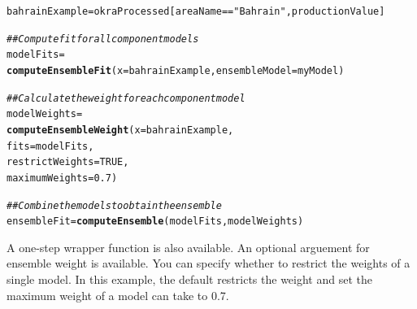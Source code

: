 \documentclass[nojss]{jss}\usepackage[]{graphicx}\usepackage[]{color}
\makeatletter
\newcommand{\hlnum}[1]{\textcolor[rgb]{0.686,0.059,0.569}{#1}}%
\newcommand{\hlstr}[1]{\textcolor[rgb]{0.192,0.494,0.8}{#1}}%
\newcommand{\hlcom}[1]{\textcolor[rgb]{0.678,0.584,0.686}{\textit{#1}}}%
\newcommand{\hlopt}[1]{\textcolor[rgb]{0,0,0}{#1}}%
\newcommand{\hlstd}[1]{\textcolor[rgb]{0.345,0.345,0.345}{#1}}%
\newcommand{\hlkwb}[1]{\textcolor[rgb]{0.69,0.353,0.396}{#1}}%
\newcommand{\hlkwc}[1]{\textcolor[rgb]{0.333,0.667,0.333}{#1}}%
\newcommand{\hlkwd}[1]{\textcolor[rgb]{0.737,0.353,0.396}{\textbf{#1}}}%
\newenvironment{kframe}{%
 \def\at@end@of@kframe{}%
 \ifinner\ifhmode%
  \def\at@end@of@kframe{\end{minipage}}%
  \begin{minipage}{\columnwidth}%
 \fi\fi%
 \def\FrameCommand##1{\hskip\@totalleftmargin \hskip-\fboxsep
 \colorbox{shadecolor}{##1}\hskip-\fboxsep
     \hskip-\linewidth \hskip-\@totalleftmargin \hskip\columnwidth}%
 \MakeFramed {\advance\hsize-\width
   \@totalleftmargin\z@ \linewidth\hsize
   \@setminipage}}%
 {\par\unskip\endMakeFramed%
 \at@end@of@kframe}
\newenvironment{knitrout}{}{} %
\makeatother
\begin{document}
\begin{knitrout}
\color{fgcolor}\begin{kframe}
\begin{alltt}
\hlstd{bahrainExample} \hlkwb{=} \hlstd{okraProcessed[areaName} \hlopt{==} \hlstr{"Bahrain"}\hlstd{, productionValue]}

\hlcom{## Compute fit for all component models}
\hlstd{modelFits} \hlkwb{=}
    \hlkwd{computeEnsembleFit}\hlstd{(}\hlkwc{x} \hlstd{= bahrainExample,} \hlkwc{ensembleModel} \hlstd{= myModel)}

\hlcom{## Calculate the weight for each component model}
\hlstd{modelWeights} \hlkwb{=}
    \hlkwd{computeEnsembleWeight}\hlstd{(}\hlkwc{x} \hlstd{= bahrainExample,}
                          \hlkwc{fits} \hlstd{= modelFits,}
                          \hlkwc{restrictWeights} \hlstd{=} \hlnum{TRUE}\hlstd{,}
                          \hlkwc{maximumWeights} \hlstd{=} \hlnum{0.7}\hlstd{)}

\hlcom{## Combine the models to obtain the ensemble}
\hlstd{ensembleFit} \hlkwb{=} \hlkwd{computeEnsemble}\hlstd{(modelFits, modelWeights)}
\end{alltt}
\end{kframe}
\end{knitrout}

A one-step wrapper function is also available.  An optional arguement
for ensemble weight is available. You can specify whether to restrict
the weights of a single model. In this example, the default restricts
the weight and set the maximum weight of a model can take to 0.7.
\end{document}
